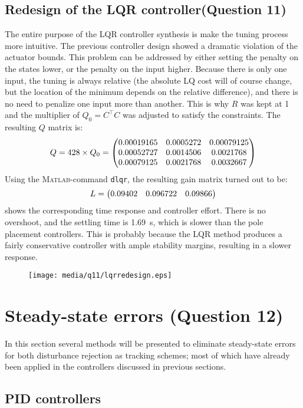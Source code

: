 \subsection{Redesign of the LQR controller\textnormal{\phantom{xxx}(Question 11)}}
\label{sec:retunelqr}
The entire purpose of the LQR controller synthesis is make the tuning process more intuitive. The previous controller design showed a dramatic violation of the actuator bounds. This problem can be addressed by either setting the penalty on the states lower, or the penalty on the input higher. Because there is only one input, the tuning is always relative (the absolute LQ cost will of course change, but the location of the minimum depends on the relative difference), and there is no need to penalize one input more than another. This is why $R$ was kept at 1 and the multiplier of $Q_0 = C^\top C$ was adjusted to satisfy the constraints. The resulting $Q$ matrix is:
$$ Q = 428\times Q_0 = \mqty(0.00019165 & 0.0005272 &  0.00079125\\
                             0.00052727 & 0.0014506 &  0.0021768\\
                             0.00079125 & 0.0021768 &  0.0032667\\) $$
Using the \textsc{Matlab}-command \texttt{dlqr}, the resulting gain matrix turned out to be:
 $$L = \mqty(0.09402 & 0.096722 & 0.09866)$$
 shows the corresponding time response and controller effort. There is no overshoot, and the settling time is \SI{1.69}{\second}, which is slower than the pole placement controllers. This is probably because the LQR method produces a fairly conservative controller with ample stability margins, resulting in a slower response.
\begin{figure}[ht]
    \centering
    \texttt{[image: media/q11/lqrredesign.eps]}
    \caption{}
    \label{fig:q11_lqrredesign}
\end{figure}

\clearpage
\section{Steady-state errors \textnormal{\phantom{xxx}(Question 12)}}
\label{sec:q12}
In this section several methods will be presented to eliminate steady-state errors for both disturbance rejection as tracking schemes; most of which have already been applied in the controllers discussed in previous sections. \cite{nise}
\subsection*{PID controllers}
